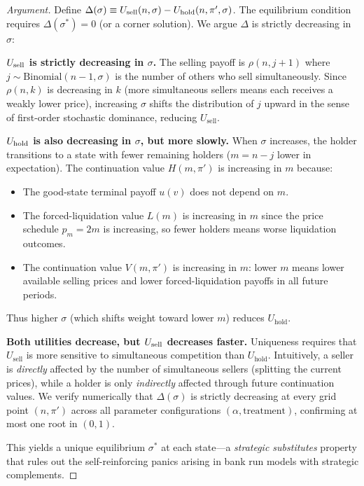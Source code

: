 \documentclass[11pt]{article}
\begin{document}
\begin{proof}[Argument]
Define $\Delta(\sigma) \equiv U_{\textup{sell}}(n, \sigma)
- U_{\textup{hold}}(n, \pi', \sigma)$. The equilibrium condition requires
$\Delta(\sigma^*) = 0$ (or a corner solution). We argue $\Delta$ is strictly
decreasing in $\sigma$:

\textbf{$U_{\textup{sell}}$ is strictly decreasing in $\sigma$.} The selling
payoff is $\rho(n, j{+}1)$ where $j \sim \text{Binomial}(n{-}1, \sigma)$ is
the number of others who sell simultaneously. Since $\rho(n, k)$ is decreasing
in $k$ (more simultaneous sellers means each receives a weakly lower price),
increasing $\sigma$ shifts the distribution of $j$ upward in the sense
of first-order stochastic dominance, reducing $U_{\text{sell}}$.

\textbf{$U_{\textup{hold}}$ is also decreasing in $\sigma$, but more slowly.}
When $\sigma$ increases, the holder transitions to a state with fewer remaining
holders ($m = n - j$ lower in expectation). The continuation value
$H(m, \pi')$ is increasing in $m$ because:
\begin{itemize}
    \item The good-state terminal payoff $u(v)$ does not depend on $m$.
    \item The forced-liquidation value $L(m)$ is increasing in $m$ since the
          price schedule $p_m = 2m$ is increasing, so fewer holders means worse
          liquidation outcomes.
    \item The continuation value $V(m, \pi')$ is increasing in $m$: lower $m$
          means lower available selling prices and lower forced-liquidation
          payoffs in all future periods.
\end{itemize}
Thus higher $\sigma$ (which shifts weight toward lower $m$) reduces
$U_{\text{hold}}$.

\textbf{Both utilities decrease, but $U_{\textup{sell}}$ decreases faster.}
Uniqueness requires that $U_{\text{sell}}$ is more sensitive to simultaneous
competition than $U_{\text{hold}}$. Intuitively, a seller is \textit{directly}
affected by the number of simultaneous sellers (splitting the current prices),
while a holder is only \textit{indirectly} affected through future continuation
values. We verify numerically that $\Delta(\sigma)$ is strictly decreasing at
every grid point $(n, \pi')$ across all parameter configurations
$(\alpha, \text{treatment})$, confirming at most one root in $(0,1)$.

This yields a unique equilibrium $\sigma^*$ at each state---a
\textit{strategic substitutes} property that rules out the self-reinforcing
panics arising in bank run models with strategic complements.
\end{proof}
\end{document}

